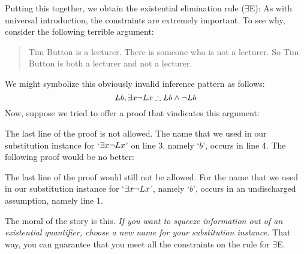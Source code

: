 Putting this together, we obtain the existential elimination rule ($\exists$E):
As with universal introduction, the constraints are extremely important. To see why, consider the following terrible argument:
	\begin{quote}
		Tim Button is a lecturer. There is someone who is not a lecturer. So Tim Button is both a lecturer and not a lecturer.
	\end{quote}
We might symbolize this obviously invalid inference pattern as follows:
$$Lb, \exists x \enot Lx \therefore Lb \eand \enot Lb$$
Now, suppose we tried to offer a proof that vindicates this argument:
\begin{fitchproof}
	\open
	\close
\end{fitchproof}
The last line of the proof is not allowed. The name that we used in our substitution instance for `$\exists x \neg Lx$' on line 3, namely `$b$', occurs in line 4. The following proof would be no better:
\begin{fitchproof}
	\open
	\close
\end{fitchproof}
The last line of the proof would still not be allowed. For the name that we used in our substitution instance for `$\exists x \neg Lx$', namely `$b$', occurs in an undischarged assumption, namely line 1.

The moral of the story is this. \emph{If you want to squeeze information out of an existential quantifier, choose a new name for your substitution instance.} That way, you can guarantee that you meet all the constraints on the rule for $\exists$E.

